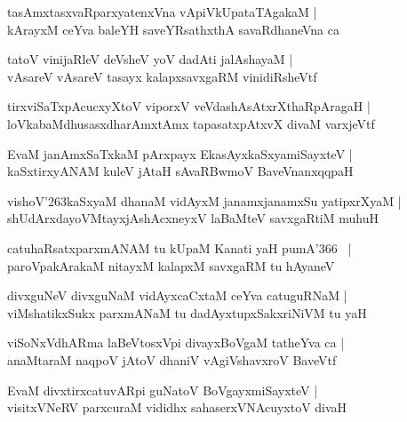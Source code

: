 \documentclass[twoside,12pt,openright]{book}
\def\S{\char'263}
\newcounter{shloka}[chapter]
\begin{document}
\begin{shloka}%
tasAmxtasxvaRparxyatenxVna vApiVkUpataTAgakaM |\\
kArayxM ceYva baleYH saveYRsathxthA savaRdhaneVna ca 
\end{shloka}

\begin{shloka}%
tatoV vinijaRleV deVsheV yoV dadAti jalAshayaM |\\
vAsareV vAsareV tasayx kalapxsavxgaRM vinidiRsheVtf 
\end{shloka}

\begin{shloka}%
tirxviSaTxpAcucxyXtoV viporxV veVdashAsAtxrXthaRpAragaH |\\
loVkabaMdhusasxdharAmxtAmx tapasatxpAtxvX divaM varxjeVtf
\end{shloka}

\begin{shloka}%
EvaM janAmxSaTxkaM pArxpayx EkasAyxkaSxyamiSayxteV |\\
kaSxtirxyANAM kuleV jAtaH sAvaRBwmoV BaveVnanxqqpaH 
\end{shloka}

\begin{shloka}%
vishoV\S kaSxyaM dhanaM vidAyxM janamxjanamxSu yatipxrXyaM |\\
shUdArxdayoVMtayxjAshAcxneyxV laBaMteV savxgaRtiM muhuH 
\end{shloka}

\begin{shloka}%
catuhaRsatxparxmANAM tu kUpaM Kanati yaH pumA\char'366 ~|\\
paroVpakArakaM nitayxM kalapxM savxgaRM tu hAyaneV 
\end{shloka}

\begin{shloka}%
divxguNeV divxguNaM vidAyxcaCxtaM ceYva catuguRNaM |\\
viMshatikxSukx parxmANaM tu dadAyxtupxSakxriNiVM tu yaH 
\end{shloka}

\begin{shloka}%
viSoNxVdhARma laBeVtosxVpi divayxBoVgaM tatheYva ca |\\
anaMtaraM naqpoV jAtoV dhaniV vAgiVshavxroV BaveVtf
\end{shloka}

\begin{shloka}%
EvaM divxtirxcatuvARpi guNatoV BoVgayxmiSayxteV |\\
visitxVNeRV parxcuraM vididhx sahaserxVNAcuyxtoV divaH 
\end{shloka}
\end{document}
